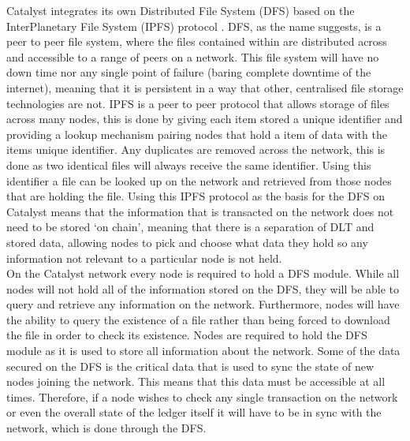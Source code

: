 Catalyst integrates its own Distributed File System (DFS) \cite{DFS} based on the InterPlanetary File System (IPFS) protocol \cite{benet2014ipfs}. DFS, as the name suggests, is a peer to peer file system, where the files contained within are distributed across and accessible to a range of peers on a network. This file system will have no down time nor any single point of failure (baring complete downtime of the internet), meaning that it is persistent in a way that other, centralised file storage technologies are not. IPFS is a peer to peer protocol that allows storage of files across many nodes, this is done by giving each item stored a unique identifier and providing a lookup mechanism pairing nodes that hold a item of data with the items unique identifier. Any duplicates are removed across the network, this is done as two identical files will always receive the same identifier. Using this identifier a file can be looked up on the network and retrieved from those nodes that are holding the file. Using this IPFS protocol as the basis for the DFS on Catalyst means that the information that is transacted on the network does not need to be stored `on chain', meaning that there is a separation of DLT and stored data, allowing nodes to pick and choose what data they hold so any information not relevant to a particular node is not held. \\ %

On the Catalyst network every node is required to hold a DFS module. While all nodes will not hold all of the information stored on the DFS, they will be able to query and retrieve any information on the network. Furthermore, nodes will have the ability to query the existence of a file rather than being forced to download the file in order to check its existence. Nodes are required to hold the DFS module as it is used to store all information about the network.  Some of the data secured on the DFS is the critical data that is used to sync the state of new nodes joining the network. This means that this data must be accessible at all times. Therefore, if a node wishes to check any single transaction on the network or even the overall state of the ledger itself it will have to be in sync with the network, which is done through the DFS.  \\ %

